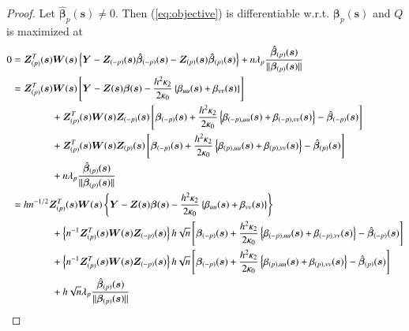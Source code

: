 \documentclass[authoryear, review, 11pt]{elsarticle}
\begin{document}
\begin{proof}
      Let $\hat{\bm{\beta}}_p(\bm{s}) \ne 0$. Then (\ref{eq:objective}) is differentiable w.r.t. $\bm{\beta}_p(\bm{s})$ and $Q$ is maximized at
      \begin{align}\label{eq:selection}
        0 &= \bm{Z}_{(p)}^T(\bm{s}) \bm{W}(\bm{s}) \left\{ \bm{Y} - \bm{Z}_{(-p)}(\bm{s}) \hat{\bm{\beta}}_{(-p)}(\bm{s}) - \bm{Z}_{(p)}(\bm{s}) \hat{\bm{\beta}}_{(p)}(\bm{s}) \right\} + n \lambda_p \frac{ \hat{\bm{\beta}}_{(p)}(\bm{s}) }{\| \bm{\beta}_{(p)}(\bm{s}) \|} \notag \\
        &= \bm{Z}_{(p)}^T(\bm{s}) \bm{W}(\bm{s}) \left[ \bm{Y} - \bm{Z}(\bm{s}) \bm{\beta}(\bm{s}) - \frac{h^2 \kappa_2}{2 \kappa_0} \left\{ \beta_{uu}(\bm{s}) + \beta_{vv}(\bm{s}) \right\} \right] \notag \\
        &\mkern+72mu+ \bm{Z}_{(p)}^T(\bm{s}) \bm{W}(\bm{s}) \bm{Z}_{(-p)}(\bm{s}) \left[ \bm{\beta}_{(-p)}(\bm{s}) + \frac{h^2 \kappa_2}{2 \kappa_0} \left\{ \beta_{(-p),uu}(\bm{s}) + \beta_{(-p),vv}(\bm{s}) \right\} - \hat{\bm{\beta}}_{(-p)}(\bm{s}) \right] \notag \\
        &\mkern+72mu+ \bm{Z}_{(p)}^T(\bm{s}) \bm{W}(\bm{s}) \bm{Z}_{(p)}(\bm{s}) \left[ \bm{\beta}_{(-p)}(\bm{s}) + \frac{h^2 \kappa_2}{2 \kappa_0} \left\{ \beta_{(p),uu}(\bm{s}) + \beta_{(p),vv}(\bm{s}) \right\} - \hat{\bm{\beta}}_{(p)}(\bm{s}) \right]  \notag \\
        &\mkern+72mu+ n \lambda_p \frac{ \hat{\bm{\beta}}_{(p)}(\bm{s}) }{\| \bm{\beta}_{(p)}(\bm{s}) \|} \notag \\
        &= h n^{-1/2} \bm{Z}_{(p)}^T(\bm{s}) \bm{W}(\bm{s}) \left\{ \bm{Y} - \bm{Z}(\bm{s}) \bm{\beta}(\bm{s}) - \frac{h^2 \kappa_2}{2 \kappa_0} \left\{ \beta_{uu}(\bm{s}) + \beta_{vv}(\bm{s}) \right\}\right\} \notag \\ 
        &\mkern+72mu+ \left\{ n^{-1} \bm{Z}_{(p)}^T(\bm{s}) \bm{W}(\bm{s}) \bm{Z}_{(-p)}(\bm{s}) \right\} h \sqrt{n} \left[ \bm{\beta}_{(-p)}(\bm{s}) + \frac{h^2 \kappa_2}{2 \kappa_0} \left\{ \beta_{(-p),uu}(\bm{s}) + \beta_{(-p),vv}(\bm{s}) \right\} - \hat{\bm{\beta}}_{(-p)}(\bm{s}) \right] \notag \\
        &\mkern+72mu+ \left\{ n^{-1} \bm{Z}_{(p)}^T(\bm{s}) \bm{W}(\bm{s}) \bm{Z}_{(-p)}(\bm{s}) \right\} h \sqrt{n} \left[ \bm{\beta}_{(-p)}(\bm{s}) + \frac{h^2 \kappa_2}{2 \kappa_0} \left\{ \beta_{(p),uu}(\bm{s}) + \beta_{(p),vv}(\bm{s}) \right\} - \hat{\bm{\beta}}_{(p)}(\bm{s}) \right] \notag \\
        &\mkern+72mu+ h \sqrt{n} \lambda_p \frac{ \hat{\bm{\beta}}_{(p)}(\bm{s}) }{\| \bm{\beta}_{(p)}(\bm{s}) \|}
      \end{align}
      

\end{proof}
\end{document}
